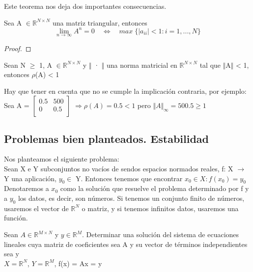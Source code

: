 Este teorema nos deja dos importantes consecuencias.

\begin{ncor}
Sea A $\in \mathbb{R}^{N \times N}$ una matriz triangular, entonces
\[ \lim_{n \rightarrow \infty} A^n = 0 \quad \Leftrightarrow \quad max \; \lbrace \vert a_{ii} \vert < 1 : i = 1,...,N \rbrace \]
\end{ncor}

\begin{proof}
\end{proof}

\begin{ncor}
Sean N $\geq$ 1, A $\in \mathbb{R}^{N \times N}$ y $\Vert$ · $\Vert$ una norma matricial en $\mathbb{R}^{N \times N}$ tal que $\Vert$A$\Vert$ < 1, entonces $\rho$(A) < 1
\end{ncor}

Hay que tener en cuenta que no se cumple la implicación contraria, por ejemplo:\\
Sea A = $\begin{bmatrix}
0.5 & 500 \\
0 & 0.5 \\
\end{bmatrix}$ $\Rightarrow \rho (A) = 0.5 < 1$ pero $\Vert A \Vert _\infty = 500.5 \geq 1$


\subsection{Problemas bien planteados. Estabilidad}
Nos planteamos el siguiente problema:\\
Sean X e Y subconjuntos no vacíos de sendos espacios normados reales, f: X $\rightarrow$ Y una aplicación, $y_0 \in$ Y. Entonces tenemos que encontrar $x_0 \in X : f(x_0) = y_0$\\
Denotaremos a $x_0$ como la solución que resuelve el problema determinado por f y a $y_0$ los datos, es decir, son números. Si tenemos un conjunto finito de números, usaremos el vector de $\mathbb{R}^N$ o matriz, y si tenemos infinitos datos, usaremos una función.

\begin{ejemplo}
Sean $A \in \mathbb{R}^{M \times N}$ y $y \in \mathbb{R}^M$. Determinar una solución del sistema de ecuaciones lineales cuya matriz de coeficientes sea A y su vector de términos independientes sea y\\
$X = \mathbb{R}^N$, $Y = \mathbb{R}^M$, f(x) = Ax = y
\end{ejemplo}


